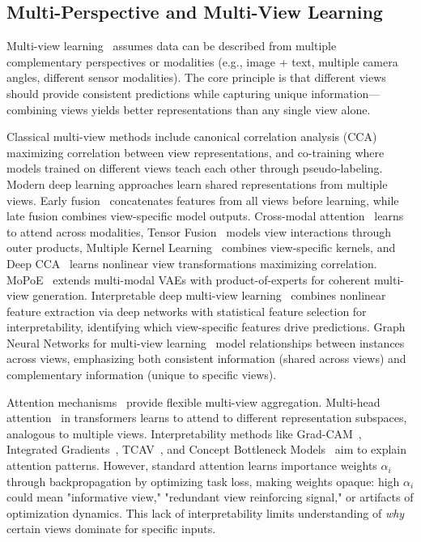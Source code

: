 \documentclass[10pt,twocolumn,letterpaper]{article}
\begin{document}
\subsection{Multi-Perspective and Multi-View Learning}

Multi-view learning~\cite{multiview_review2024} assumes data can be described from multiple complementary perspectives or modalities (e.g., image + text, multiple camera angles, different sensor modalities). The core principle is that different views should provide consistent predictions while capturing unique information—combining views yields better representations than any single view alone.

Classical multi-view methods include canonical correlation analysis (CCA) maximizing correlation between view representations, and co-training where models trained on different views teach each other through pseudo-labeling. Modern deep learning approaches learn shared representations from multiple views. Early fusion~\cite{atrey2010fusion} concatenates features from all views before learning, while late fusion combines view-specific model outputs. Cross-modal attention~\cite{lu2019vilbert} learns to attend across modalities, Tensor Fusion~\cite{zadeh2017tensor} models view interactions through outer products, Multiple Kernel Learning~\cite{gonen2011mkl} combines view-specific kernels, and Deep CCA~\cite{andrew2013dcca} learns nonlinear view transformations maximizing correlation. MoPoE~\cite{sutter2021mopoe} extends multi-modal VAEs with product-of-experts for coherent multi-view generation. Interpretable deep multi-view learning~\cite{ideepview2024} combines nonlinear feature extraction via deep networks with statistical feature selection for interpretability, identifying which view-specific features drive predictions. Graph Neural Networks for multi-view learning~\cite{gnn_multiview2024} model relationships between instances across views, emphasizing both consistent information (shared across views) and complementary information (unique to specific views).

Attention mechanisms~\cite{chaudhari2021attention} provide flexible multi-view aggregation. Multi-head attention~\cite{multihead_attention2024} in transformers learns to attend to different representation subspaces, analogous to multiple views. Interpretability methods like Grad-CAM~\cite{selvaraju2017gradcam}, Integrated Gradients~\cite{sundararajan2017integrated}, TCAV~\cite{kim2018tcav}, and Concept Bottleneck Models~\cite{koh2020concept} aim to explain attention patterns. However, standard attention learns importance weights $\alpha_i$ through backpropagation by optimizing task loss, making weights opaque: high $\alpha_i$ could mean "informative view," "redundant view reinforcing signal," or artifacts of optimization dynamics. This lack of interpretability limits understanding of \textit{why} certain views dominate for specific inputs.
\end{document}
